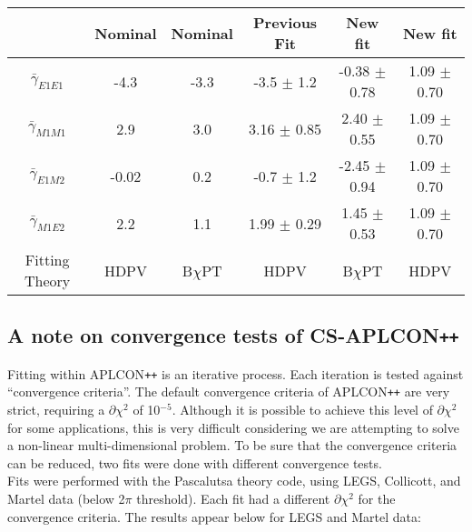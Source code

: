 \documentclass[]{article}
\begin{document}
\begin{table}[h!]
	\centering %
	\begin{tabular}{|c|cc|c|c|c|} %
		\hline
		                    & Nominal & Nominal & Previous Fit & New fit & New fit\\
		\hline %
		$\bar{\gamma}_{E1E1}$ & -4.3 & -3.3 & -3.5 $\pm$ 1.2 & -0.38 $\pm$ 0.78 & 1.09 $\pm$ 0.70 \\ 
		$\bar{\gamma}_{M1M1}$ & 2.9 & 3.0 & 3.16 $\pm$ 0.85 & 2.40 $\pm$ 0.55 & 1.09 $\pm$ 0.70\\
		$\bar{\gamma}_{E1M2}$ & -0.02 & 0.2 & -0.7 $\pm$ 1.2 & -2.45 $\pm$ 0.94 & 1.09 $\pm$ 0.70\\
		$\bar{\gamma}_{M1E2}$ & 2.2 & 1.1 & 1.99 $\pm$ 0.29 & 1.45 $\pm$ 0.53 & 1.09 $\pm$ 0.70\\[0.5ex]
		\hline
		Fitting Theory & HDPV & B$\chi$PT & HDPV & B$\chi$PT& HDPV\\
		\hline
	\end{tabular}
\end{table}




















\newpage 
\subsection{A note on convergence tests of CS-APLCON\texttt{++}}\label{Section:Convergence}

Fitting within APLCON\texttt{++} is an iterative process. Each iteration is tested against \enquote{convergence criteria}. The default convergence criteria of APLCON\texttt{++} are very strict, requiring a $\partial\chi^{2}$ of 10$^{-5}$. Although it is possible to achieve this level of $\partial\chi^{2}$ for some applications, this is very difficult considering we are attempting to solve a non-linear multi-dimensional problem. To be sure that the convergence criteria can be reduced, two fits were done with different convergence tests. \\

\noindent Fits were performed with the Pascalutsa theory code, using LEGS, Collicott, and Martel data (below 2$\pi$ threshold). Each fit had a different $\partial\chi^{2}$ for the convergence criteria. The results appear below for LEGS and Martel data:
 
\end{document}

